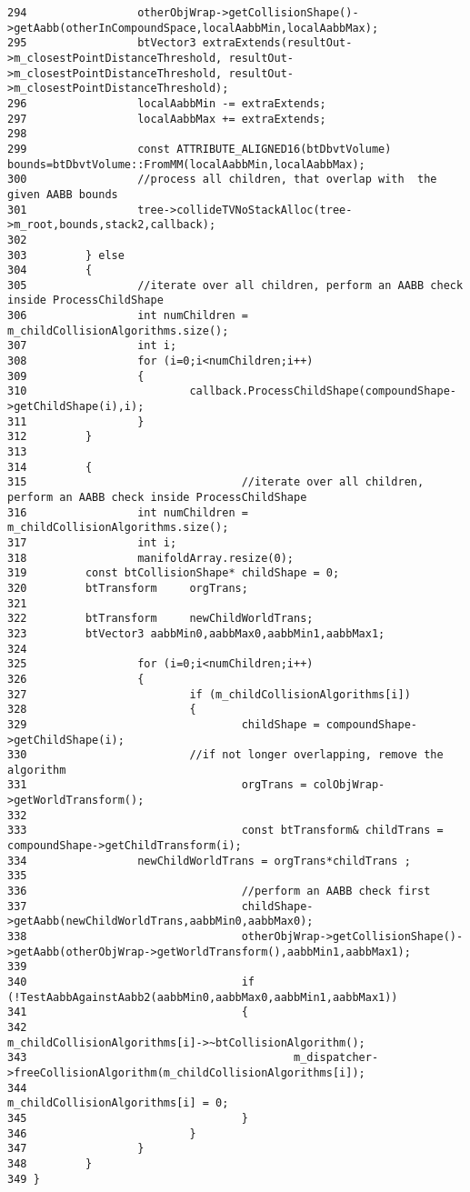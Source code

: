 \begin{Code}
\begin{verbatim}
294                 otherObjWrap->getCollisionShape()->getAabb(otherInCompoundSpace,localAabbMin,localAabbMax);
295                 btVector3 extraExtends(resultOut->m_closestPointDistanceThreshold, resultOut->m_closestPointDistanceThreshold, resultOut->m_closestPointDistanceThreshold);
296                 localAabbMin -= extraExtends;
297                 localAabbMax += extraExtends;
298 
299                 const ATTRIBUTE_ALIGNED16(btDbvtVolume) bounds=btDbvtVolume::FromMM(localAabbMin,localAabbMax);
300                 //process all children, that overlap with  the given AABB bounds
301                 tree->collideTVNoStackAlloc(tree->m_root,bounds,stack2,callback);
302 
303         } else
304         {
305                 //iterate over all children, perform an AABB check inside ProcessChildShape
306                 int numChildren = m_childCollisionAlgorithms.size();
307                 int i;
308                 for (i=0;i<numChildren;i++)
309                 {
310                         callback.ProcessChildShape(compoundShape->getChildShape(i),i);
311                 }
312         }
313 
314         {
315                                 //iterate over all children, perform an AABB check inside ProcessChildShape
316                 int numChildren = m_childCollisionAlgorithms.size();
317                 int i;
318                 manifoldArray.resize(0);
319         const btCollisionShape* childShape = 0;
320         btTransform     orgTrans;
321         
322         btTransform     newChildWorldTrans;
323         btVector3 aabbMin0,aabbMax0,aabbMin1,aabbMax1;        
324         
325                 for (i=0;i<numChildren;i++)
326                 {
327                         if (m_childCollisionAlgorithms[i])
328                         {
329                                 childShape = compoundShape->getChildShape(i);
330                         //if not longer overlapping, remove the algorithm
331                                 orgTrans = colObjWrap->getWorldTransform();
332                 
333                                 const btTransform& childTrans = compoundShape->getChildTransform(i);
334                 newChildWorldTrans = orgTrans*childTrans ;
335 
336                                 //perform an AABB check first
337                                 childShape->getAabb(newChildWorldTrans,aabbMin0,aabbMax0);
338                                 otherObjWrap->getCollisionShape()->getAabb(otherObjWrap->getWorldTransform(),aabbMin1,aabbMax1);
339 
340                                 if (!TestAabbAgainstAabb2(aabbMin0,aabbMax0,aabbMin1,aabbMax1))
341                                 {
342                                         m_childCollisionAlgorithms[i]->~btCollisionAlgorithm();
343                                         m_dispatcher->freeCollisionAlgorithm(m_childCollisionAlgorithms[i]);
344                                         m_childCollisionAlgorithms[i] = 0;
345                                 }
346                         }
347                 }
348         }
349 }
\end{verbatim}
\end{Code}




